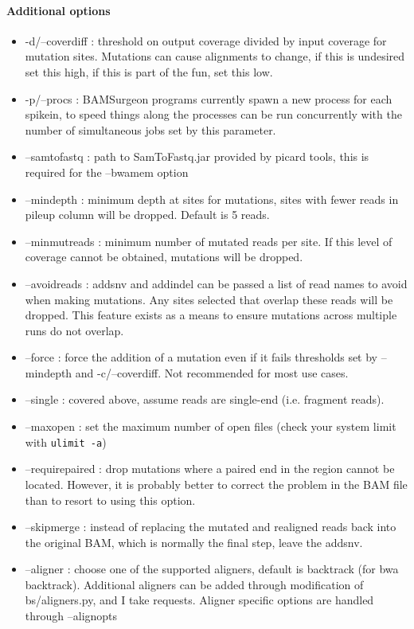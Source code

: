 \documentclass[letterpaper,11pt]{article}
\begin{document}
\paragraph{Additional options}
\begin{itemize}
\item -d/--coverdiff : threshold on output coverage divided by input coverage for mutation sites. Mutations can cause alignments to change, if this is undesired set this high, if this is part of the fun, set this low.
\item -p/--procs : BAMSurgeon programs currently spawn a new process for each spikein, to speed things along the processes can be run concurrently with the number of simultaneous jobs set by this parameter.
\item --samtofastq : path to SamToFastq.jar provided by picard tools, this is required for the --bwamem option
\item --mindepth : minimum depth at sites for mutations, sites with fewer reads in pileup column will be dropped. Default is 5 reads.
\item --minmutreads : minimum number of mutated reads per site. If this level of coverage cannot be obtained, mutations will be dropped.
\item --avoidreads : addsnv and addindel can be passed a list of read names to avoid when making mutations. Any sites selected that overlap these reads will be dropped. This feature exists as a means to ensure mutations across multiple runs do not overlap.
\item --force : force the addition of a mutation even if it fails thresholds set by --mindepth and -c/--coverdiff. Not recommended for most use cases.
\item --single : covered above, assume reads are single-end (i.e. fragment reads).
\item --maxopen : set the maximum number of open files (check your system limit with \texttt{ulimit -a})
\item --requirepaired : drop mutations where a paired end in the region cannot be located. However, it is probably better to correct the problem in the BAM file than to resort to using this option.
\item --skipmerge : instead of replacing the mutated and realigned reads back into the original BAM, which is normally the final step, leave the addsnv.
\item --aligner : choose one of the supported aligners, default is backtrack (for bwa backtrack). Additional aligners can be added through modification of bs/aligners.py, and I take requests. Aligner specific options are handled through --alignopts

\end{itemize}
\end{document}

